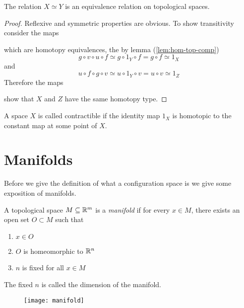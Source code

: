 \begin{lem}
    The relation $X \simeq Y$ is an equivalence relation on topological spaces.
\end{lem}

\begin{proof}
    Reflexive and symmetric properties are obvious. To show transitivity consider the maps
    \begin{center}
\qquad
    \end{center} 
    which are homotopy equivalences, the by lemma (\ref{lem:hom-top-comp})
    \[
        g \circ v \circ u \circ f \simeq g \circ 1_Y \circ f = g \circ f \simeq 1_X  
    \]
    and 
    \[
        u \circ f \circ g \circ v \simeq u \circ 1_Y \circ v = u \circ v \simeq 1_Z  
    \]
    Therefore the maps
    \begin{center}
    \end{center}
    show that $X$ and $Z$ have the same homotopy type.
\end{proof}

\begin{defn}
A space $X$ is called contractible if the identity map $1_X$ is homotopic to the constant map at some point of $X$.
\end{defn}

\section{Manifolds}
Before we give the definition of what a configuration space is we give some exposition of manifolds.
\begin{defn}
    A topological space $M \subseteq \mathbb{R}^m$ is a \textit{manifold} if for every $x \in M$, there exists an open set $O \subset M$ such that 
    \begin{enumerate}
        \item $x \in O$
        \item $O$ is homeomorphic to $\mathbb{R}^n$
        \item $n$ is fixed for all $x \in M$
    \end{enumerate}
    The fixed $n$ is called the dimension of the manifold.
    \begin{figure}[H]
        \centering
        \texttt{[image: manifold]}
    \end{figure}
\end{defn}

